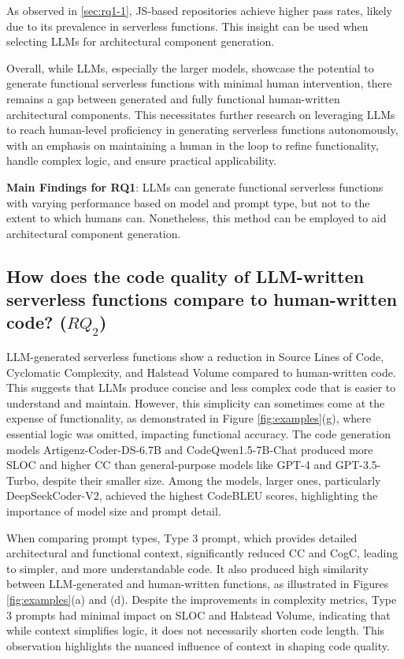 As observed in \ref{sec:rq1-1}, JS-based repositories achieve higher pass rates, likely due to its prevalence in serverless functions. This insight can be used when selecting LLMs for architectural component generation.

Overall, while LLMs, especially the larger models, showcase the potential to generate functional serverless functions with minimal human intervention, there remains a gap between generated and fully functional human-written architectural components. This necessitates further research on leveraging LLMs to reach human-level proficiency in generating serverless functions autonomously, with an emphasis on maintaining a human in the loop to refine functionality, handle complex logic, and ensure practical applicability.

\begin{tcolorbox}[colback=orange!5!white, colframe=orange!95!white, colbacktitle=orange!95!white]
\small
    \textbf{Main Findings for RQ1}: LLMs can generate functional serverless functions with varying performance based on model and prompt type, but not to the extent to which humans can. Nonetheless, this method can be employed to aid architectural component generation.
\end{tcolorbox}

\subsection{How does the code quality of LLM-written serverless functions compare to human-written code? ($RQ_{2}$)}

LLM-generated serverless functions show a reduction in 
Source Lines of Code, Cyclomatic Complexity, and Halstead Volume 
compared to human-written code. This suggests that LLMs produce concise and less complex code that is easier to understand and maintain. However, this simplicity can sometimes come at the expense of functionality, as demonstrated in Figure \ref{fig:examples}(g), where essential logic was omitted, impacting functional accuracy. The code generation models Artigenz-Coder-DS-6.7B and CodeQwen1.5-7B-Chat produced more SLOC and higher CC than general-purpose models like GPT-4 and GPT-3.5-Turbo, despite their smaller size. Among the models, larger ones, particularly DeepSeekCoder-V2, achieved the highest CodeBLEU scores, highlighting the importance of model size and prompt detail.

When comparing prompt types, Type 3 prompt, which provides detailed architectural and functional context, significantly reduced CC and CogC, leading to simpler, and more understandable code. It also produced high similarity between LLM-generated and human-written functions, as illustrated in Figures \ref{fig:examples}(a) and (d). Despite the improvements in complexity metrics, Type 3 prompts had minimal impact on SLOC and Halstead Volume, indicating that while context simplifies logic, it does not necessarily shorten code length. This observation highlights the nuanced influence of context in shaping code quality.

